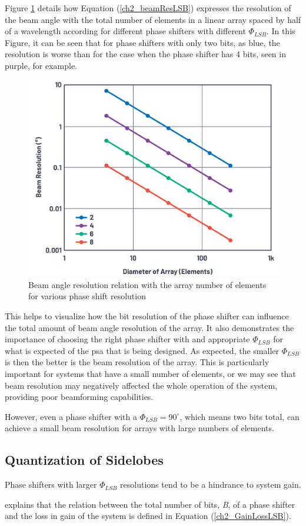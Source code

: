 \par Figure \ref{fig:ch_2_secArray_PhaseResElements.png} details how Equation (\ref{ch2_beamResLSB}) expresses the resolution of the beam angle with the total number of elements in a linear array spaced by half of a wavelength according for different phase shifters with different $\Phi_{LSB}$. In this Figure, it can be seen that for phase shifters with only two bits, as blue, the resolution is worse than for the case when the phase shifter has 4 bits, seen in purple, for example.
\begin{figure}[H]
    \vspace*{0cm}
    \centering
    \includegraphics[width=0.5\linewidth]{figs/ch_2_secArray_PhaseResElements.png}
    \caption{Beam angle resolution relation with the array number of elements for various phase shift resolution\cite{Delos2020PhasedDevicesc}}
    \label{fig:ch_2_secArray_PhaseResElements.png}
\end{figure}

\par This helps to visualize how the bit resolution of the phase shifter can influence the total amount of beam angle resolution of the array. It also demonstrates the importance of choosing the right phase shifter with and appropriate $\Phi_{LSB}$ for what is expected of the \ac{psa} that is being designed. As expected, the smaller $\Phi_{LSB}$ is then the better is the beam resolution of the array. This is particularly important for systems that have a small number of elements, or we may see that beam resolution may negatively affected the whole operation of the system, providing poor beamforming capabilities.

\par However, even a phase shifter with a $\Phi_{LSB} = 90^{\circ}$, which means two bits total, can achieve a small beam resolution for arrays with large numbers of elements.

\subsection{Quantization of Sidelobes}
\par Phase shifters with larger $\Phi_{LSB}$ resolutions tend to be a hindrance to system gain.
\par \citeauthor{Skolnik2008RadarHandbook} explains that the relation between the total number of bits, \textit{B}, of a phase shifter and the loss in gain of the system is defined in Equation (\ref{ch2_GainLossLSB}).

